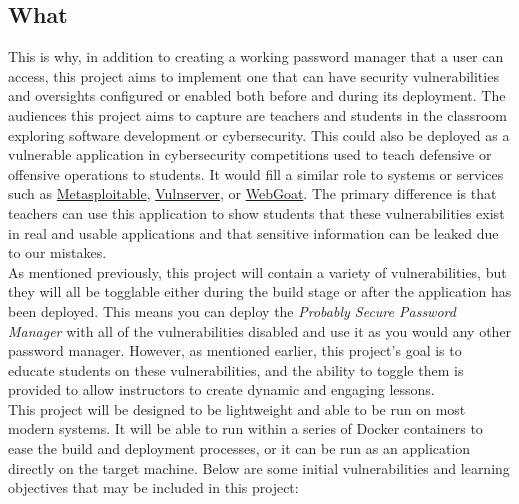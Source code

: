 \subsection{What}
This is why, in addition to creating a working password manager that a user can access, this project aims to implement one that can have security vulnerabilities and oversights configured or enabled both before and during its deployment. The audiences this project aims to capture are teachers and students in the classroom exploring software development or cybersecurity. This could also be deployed as a vulnerable application in cybersecurity competitions used to teach defensive or offensive operations to students. It would fill a similar role to systems or services such as \href{https://github.com/rapid7/metasploitable3}{Metasploitable}, \href{https://github.com/stephenbradshaw/vulnserver}{Vulnserver}, or \href{https://github.com/WebGoat/WebGoat}{WebGoat}. The primary difference is that teachers can use this application to show students that these vulnerabilities exist in real and usable applications and that sensitive information can be leaked due to our mistakes.\\

\noindent As mentioned previously, this project will contain a variety of vulnerabilities, but they will all be togglable either during the build stage or after the application has been deployed. This means you can deploy the \textit{Probably Secure Password Manager} with all of the vulnerabilities disabled and use it as you would any other password manager. However, as mentioned earlier, this project's goal is to educate students on these vulnerabilities, and the ability to toggle them is provided to allow instructors to create dynamic and engaging lessons.\\

\noindent This project will be designed to be lightweight and able to be run on most modern systems. It will be able to run within a series of Docker containers to ease the build and deployment processes, or it can be run as an application directly on the target machine. Below are some initial vulnerabilities and learning objectives that may be included in this project:\\

